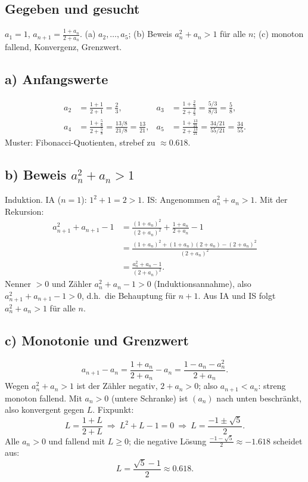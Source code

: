 

\subsection*{Gegeben und gesucht}
$a_1=1$, $a_{n+1}=\frac{1+a_n}{2+a_n}$. (a) $a_2,\dots,a_5$; (b) Beweis
$a_n^2+a_n>1$ f\"ur alle $n$; (c) monoton fallend, Konvergenz, Grenzwert.

\subsection*{a) Anfangswerte}
\begin{align}
  a_2&=\frac{1+1}{2+1}=\frac23, &
  a_3&=\frac{1+\frac23}{2+\frac23}=\frac{5/3}{8/3}=\frac58,\\
  a_4&=\frac{1+\frac58}{2+\frac58}=\frac{13/8}{21/8}=\frac{13}{21}, &
  a_5&=\frac{1+\frac{13}{21}}{2+\frac{13}{21}}=\frac{34/21}{55/21}=\frac{34}{55}.
\end{align}
Muster: Fibonacci-Quotienten, strebef zu $\approx0.618$.

\subsection*{b) Beweis $a_n^2+a_n>1$}
Induktion. IA ($n=1$): $1^2+1=2>1$. \checkmark
IS: Angenommen $a_n^2+a_n>1$. Mit der Rekursion:
\begin{align}
  a_{n+1}^2+a_{n+1}-1
  &=\frac{(1+a_n)^2}{(2+a_n)^2}+\frac{1+a_n}{2+a_n}-1 \\
  &=\frac{(1+a_n)^2+(1+a_n)(2+a_n)-(2+a_n)^2}{(2+a_n)^2} \\
  &=\frac{a_n^2+a_n-1}{(2+a_n)^2}.
\end{align}
Nenner $>0$ und Z\"ahler $a_n^2+a_n-1>0$ (Induktionsannahme), also
$a_{n+1}^2+a_{n+1}-1>0$, d.h.\ die Behauptung f\"ur $n+1$. Aus IA und IS
folgt $a_n^2+a_n>1$ f\"ur alle $n$.

\subsection*{c) Monotonie und Grenzwert}
\begin{equation}
  a_{n+1}-a_n=\frac{1+a_n}{2+a_n}-a_n
  =\frac{1-a_n-a_n^2}{2+a_n}.
\end{equation}
Wegen $a_n^2+a_n>1$ ist der Z\"ahler negativ, $2+a_n>0$; also
$a_{n+1}<a_n$: streng monoton fallend. Mit $a_n>0$ (untere Schranke) ist
$(a_n)$ nach unten beschr\"ankt, also konvergent gegen $L$. Fixpunkt:
\begin{equation}
  L=\frac{1+L}{2+L}\ \Longrightarrow\ L^2+L-1=0\ \Longrightarrow\
  L=\frac{-1\pm\sqrt5}2 .
\end{equation}
Alle $a_n>0$ und fallend mit $L\ge0$; die negative L\"osung
$\frac{-1-\sqrt5}2\approx-1.618$ scheidet aus:
\begin{equation}
  L=\frac{\sqrt5-1}2 \approx0.618 .
\end{equation}

